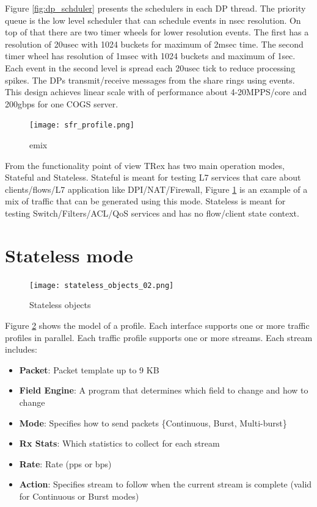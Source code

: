\documentclass[conference]{IEEEtran}
\begin{document}
Figure \ref{fig:dp_schduler} presents the schedulers in each DP thread. The priority queue is the low level scheduler that can schedule events in nsec resolution. On top of that there are two timer wheels for lower resolution events. The first has a resolution of 20usec with 1024 buckets for maximum of 2msec time. 
The second timer wheel has resolution of 1msec with 1024 buckets and maximum of 1sec. Each event in the second level is spread each 20usec tick to reduce processing spikes. 
The DPs transmit/receive messages from the share rings using events. 
This design achieves linear scale with of performance about 4-20MPPS/core and 200gbps for one COGS server. 

\begin{figure}[h]
  \texttt{[image: sfr\_profile.png]}
  \caption{emix}
  \label{fig:emix}
\end{figure}

From the functionality point of view TRex has two main operation modes, Stateful and Stateless. 
Stateful is meant for testing L7 services that care about clients/flows/L7 application like DPI/NAT/Firewall, Figure \ref{fig:emix} is an example of a mix of traffic that can be generated using this mode. 
Stateless is meant for testing Switch/Filters/ACL/QoS services and has no flow/client state context.

\section{Stateless mode}

\begin{figure}[h]
  \texttt{[image: stateless\_objects\_02.png]}
  \caption{Stateless objects}
  \label{fig:stlobjects}
\end{figure}

Figure \ref{fig:stlobjects} shows the model of a profile. Each interface supports one or more traffic profiles in parallel.
Each traffic profile supports one or more streams. Each stream includes:

\begin{itemize}
  \item \textbf{Packet}: Packet template up to 9 KB
  \item \textbf{Field Engine}: A program that determines which field to change and how to change 
  \item \textbf{Mode}: Specifies how to send packets \{Continuous, Burst, Multi-burst\}
  \item \textbf{Rx Stats}: Which statistics to collect for each stream
  \item \textbf{Rate}: Rate (pps or bps)
  \item \textbf{Action}: Specifies stream to follow when the current stream is complete (valid for Continuous or Burst modes)
\end{itemize}
\end{document}
